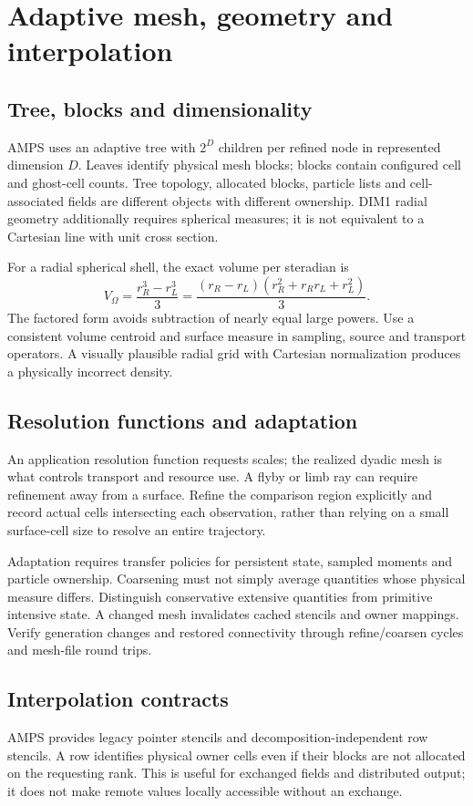 \chapter{Adaptive mesh, geometry and interpolation}\label{ch:mesh}
\section{Tree, blocks and dimensionality}
AMPS uses an adaptive tree with $2^D$ children per refined node in represented
dimension $D$. Leaves identify physical mesh blocks; blocks contain configured
cell and ghost-cell counts. Tree topology, allocated blocks, particle lists
and cell-associated fields are different objects with different ownership.
DIM1 radial geometry additionally requires spherical measures; it is not
equivalent to a Cartesian line with unit cross section.

For a radial spherical shell, the exact volume per steradian is
\begin{equation}
V_\Omega=\frac{r_R^3-r_L^3}{3}
=\frac{(r_R-r_L)(r_R^2+r_Rr_L+r_L^2)}{3}.
\end{equation}
The factored form avoids subtraction of nearly equal large powers. Use a
consistent volume centroid and surface measure in sampling, source and
transport operators. A visually plausible radial grid with Cartesian
normalization produces a physically incorrect density.

\section{Resolution functions and adaptation}
An application resolution function requests scales; the realized dyadic mesh
is what controls transport and resource use. A flyby or limb ray can require
refinement away from a surface. Refine the comparison region explicitly and
record actual cells intersecting each observation, rather than relying on
a small surface-cell size to resolve an entire trajectory.

Adaptation requires transfer policies for persistent state, sampled moments
and particle ownership. Coarsening must not simply average quantities whose
physical measure differs. Distinguish conservative extensive quantities from
primitive intensive state. A changed mesh invalidates cached stencils and
owner mappings. Verify generation changes and restored connectivity through
refine/coarsen cycles and mesh-file round trips.

\section{Interpolation contracts}
AMPS provides legacy pointer stencils and decomposition-independent row
stencils. A row identifies physical owner cells even if their blocks are not
allocated on the requesting rank. This is useful for exchanged fields and
distributed output; it does not make remote values locally accessible without
an exchange.

